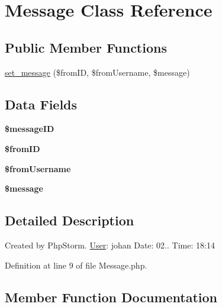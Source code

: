 \hypertarget{class_message}{}\section{Message Class Reference}
\label{class_message}
\subsection*{Public Member Functions}
\begin{DoxyCompactItemize}
\item 
\hyperlink{class_message_a236d96a999436f667b75462621635329}{set\+\_\+message} (\$from\+ID, \$from\+Username, \$message)
\end{DoxyCompactItemize}
\subsection*{Data Fields}
\begin{DoxyCompactItemize}
\item 
\mbox{\label{class_message_a5c507155944f7032089f120efa5f8f36}} 
{\bfseries \$message\+ID}
\item 
\mbox{\label{class_message_ad8dc72dc170b758cbb59b827cdb3aa31}} 
{\bfseries \$from\+ID}
\item 
\mbox{\label{class_message_a34edec9dd5007ed33c8a628a7c4e907a}} 
{\bfseries \$from\+Username}
\item 
\mbox{\label{class_message_abf17cb2dba2ed17cb28aa5f37deb5293}} 
{\bfseries \$message}
\end{DoxyCompactItemize}


\subsection{Detailed Description}
Created by Php\+Storm. \hyperlink{class_user}{User}\+: johan Date\+: 02.. Time\+: 18\+:14 

Definition at line 9 of file Message.\+php.



\subsection{Member Function Documentation}
\mbox{\label{class_message_a236d96a999436f667b75462621635329}} 
